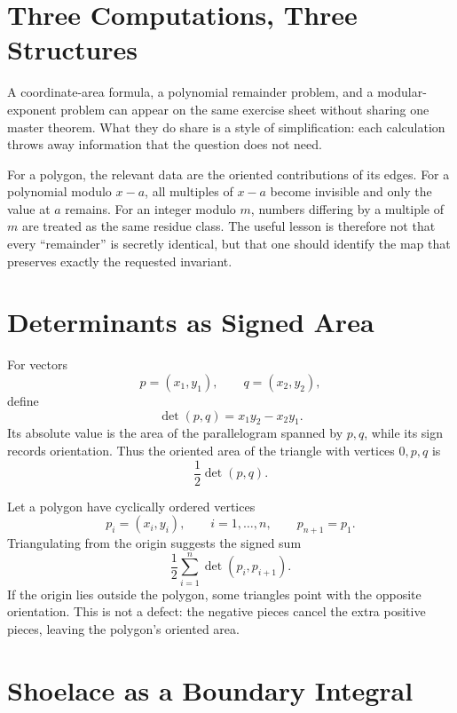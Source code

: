 
\section{Three Computations, Three Structures}

A coordinate-area formula, a polynomial remainder problem, and a modular-exponent problem can appear on the same exercise sheet without sharing one master theorem.  What they do share is a style of simplification: each calculation throws away information that the question does not need.

For a polygon, the relevant data are the oriented contributions of its edges.  For a polynomial modulo \(x-a\), all multiples of \(x-a\) become invisible and only the value at \(a\) remains.  For an integer modulo \(m\), numbers differing by a multiple of \(m\) are treated as the same residue class.  The useful lesson is therefore not that every ``remainder'' is secretly identical, but that one should identify the map that preserves exactly the requested invariant.

\section{Determinants as Signed Area}

For vectors
\[
  p=(x_1,y_1),
  \qquad
  q=(x_2,y_2),
\]
define
\[
  \det(p,q)=x_1y_2-x_2y_1.
\]
Its absolute value is the area of the parallelogram spanned by \(p,q\), while its sign records orientation.  Thus the oriented area of the triangle with vertices \(0,p,q\) is
\[
  \frac12\det(p,q).
\]

Let a polygon have cyclically ordered vertices
\[
  p_i=(x_i,y_i),
  \qquad i=1,\ldots,n,
  \qquad p_{n+1}=p_1.
\]
Triangulating from the origin suggests the signed sum
\[
  \frac12\sum_{i=1}^n\det(p_i,p_{i+1}).
\]
If the origin lies outside the polygon, some triangles point with the opposite orientation.  This is not a defect: the negative pieces cancel the extra positive pieces, leaving the polygon's oriented area.

\section{Shoelace as a Boundary Integral}

